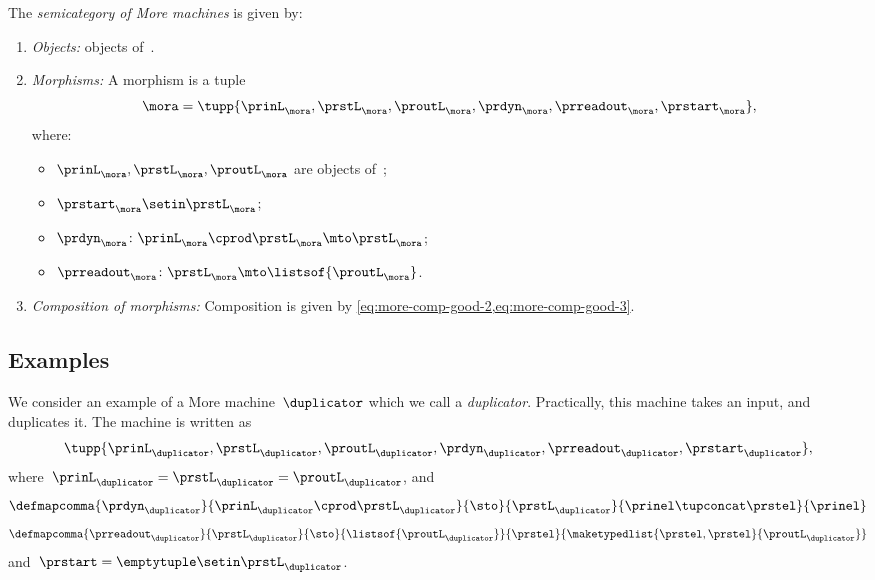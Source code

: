\begin{definition}[\More]
    \label{def:More}
    The \emph{semicategory of More machines} \More is given by:
    \begin{enumerate}
        \item \emph{Objects:} objects of~\SetL.
        \item \emph{Morphisms:}
              A morphism is a tuple
              \begin{equation}
                  \mora = \tupp{\prinL_{\mora},\prstL_{\mora}, \proutL_{\mora},\prdyn_{\mora},\prreadout_{\mora},\prstart_{\mora}},
              \end{equation}
              where:
              \begin{itemize}
                  \item $\prinL_{\mora},\prstL_{\mora}, \proutL_{\mora}$ are objects of~\SetL;
                  \item $\prstart_{\mora} \setin \prstL_{\mora}$;
                  \item $ \prdyn_{\mora} \colon \prinL_{\mora} \cprod \prstL_{\mora} \mto \prstL_{\mora}$;
                  \item $ \prreadout_{\mora} \colon \prstL_{\mora}  \mto \listsof{\proutL_{\mora}}$.
              \end{itemize}
        \item \emph{Composition of morphisms:}
              Composition is given by \cref{eq:more-comp-good-2,eq:more-comp-good-3}.
    \end{enumerate}
\end{definition}

\subsection{Examples}

\begin{example}[Duplicator]
    We consider an example of a More machine~$\duplicator$ which we call a \emph{duplicator}.
    Practically, this machine takes an input, and duplicates it.
    The machine is written as
    \begin{equation}
        \tupp{\prinL_{\duplicator},\prstL_{\duplicator},\proutL_{\duplicator},\prdyn_{\duplicator},\prreadout_{\duplicator},\prstart_{\duplicator}},
    \end{equation}
    where~$\prinL_{\duplicator}=\prstL_{\duplicator}=\proutL_\duplicator$, and
    \begin{equation}
        \defmapcomma{\prdyn_\duplicator}
        {\prinL_\duplicator \cprod \prstL_\duplicator}
        {\sto}
        {\prstL_\duplicator}
        {\prinel \tupconcat \prstel}
        {\prinel}
    \end{equation}
    \begin{equation}
        \defmapcomma{\prreadout_\duplicator}
        {\prstL_\duplicator}
        {\sto}
        {\listsof{\proutL_\duplicator}}
        {\prstel}
        {\maketypedlist{\prstel,\prstel}{\proutL_\duplicator}}
    \end{equation}
    and~$\prstart=\emptytuple \setin \prstL_\duplicator$.
\end{example}

